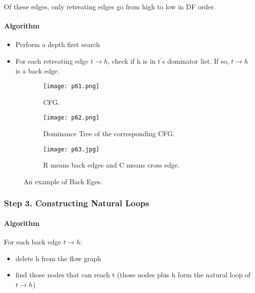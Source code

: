 Of these edges, only retreating edges go from high to low in DF order.



\paragraph{Algorithm}

\begin{itemize}
    \item Perform a depth first search
    \item For each retreating edge \(t \rightarrow h\), check if h is in t$^\prime$s dominator list. If so,  \(t \rightarrow h\) is a back edge.
\end{itemize}


\begin{figure}[H]
    \centering
    \begin{subfigure}{0.3\textwidth}
    \centering
        \texttt{[image: p61.png]}
        \caption{CFG.}
        \label{fig:p61}
    \end{subfigure}
    \begin{subfigure}{0.3\textwidth}
    \centering
        \texttt{[image: p62.png]}
        \caption{Dominance Tree of the corresponding CFG.}
        \label{fig:p62}
    \end{subfigure}
    \begin{subfigure}{0.3\textwidth}
        \centering
            \texttt{[image: p63.jpg]}
            \caption{{\color{red} R} means back edges and {\color{orange} C} means cross edge.}
            \label{fig:p62}
        \end{subfigure}
    \caption{An example of Back Eges.}
       \label{fig:p51-58}
\end{figure}

\subsubsection{Step 3. Constructing Natural Loops}

\paragraph{Algorithm} For each back edge $t\rightarrow h$:

\begin{itemize}
    \item delete h from the flow graph
    \item find those nodes that can reach t
(those nodes plus h form the natural loop of \(t \rightarrow h\))
\end{itemize}

